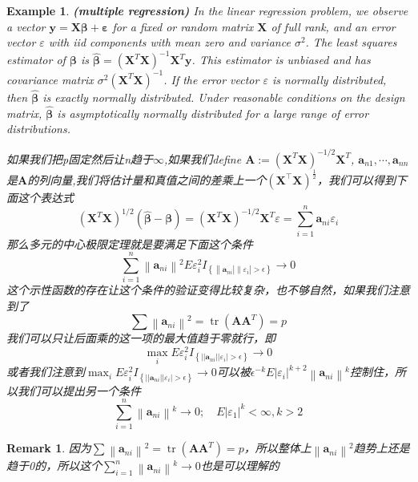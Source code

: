 \documentclass{article}
\newtheorem{example}{Example}[section]
\newtheorem{remark}{Remark}[theorem]
\begin{document}
\begin{example}
	\textbf{(multiple regression)} In the linear regression problem, we observe a vector $\mathbf{y}=\mathbf{X} \boldsymbol{\beta}+\boldsymbol{\varepsilon}$ for a fixed or random matrix $\mathbf{X}$ of full rank, and an error vector $\varepsilon$ with iid components with mean zero and variance $\sigma^2$. The least squares estimator of $\boldsymbol{\beta}$ is $\widehat{\boldsymbol{\beta}}=\left(\mathbf{X}^T \mathbf{X}\right)^{-1} \mathbf{X}^T \mathbf{y}$. This estimator is unbiased and has covariance matrix $\sigma^2\left(\mathbf{X}^T \mathbf{X}\right)^{-1}$. If the error vector $\varepsilon$ is normally distributed, then $\widehat{\boldsymbol{\beta}}$ is exactly normally distributed. Under reasonable conditions on the design matrix, $\widehat{\boldsymbol{\beta}}$ is asymptotically normally distributed for a large range of error distributions.
	\par 如果我们把p固定然后让n趋于$\infty$,如果我们define $\mathbf{A}:=\left(\mathbf{X}^T \mathbf{X}\right)^{-1 / 2} \mathbf{X}^T$, $\mathbf{a}_{n1},\cdots,\mathbf{a}_{nn}$是$\mathbf{A}$的列向量,我们将估计量和真值之间的差乘上一个$\left(\bm{X}^{\top}\bm{X}\right)^{\frac{1}{2}}$，我们可以得到下面这个表达式
	$$
	\left(\mathbf{X}^T \mathbf{X}\right)^{1 / 2}(\widehat{\boldsymbol{\beta}}-\boldsymbol{\beta})=\left(\mathbf{X}^T \mathbf{X}\right)^{-1 / 2} \mathbf{X}^T \varepsilon=\sum_{i=1}^n \mathbf{a}_{n i} \varepsilon_i
	$$
	那么多元的中心极限定理就是要满足下面这个条件
	$$
	\sum_{i=1}^n\left\|\mathbf{a}_{n i}\right\|^2 E \varepsilon_i^2 I_{\left\{\left\|\mathbf{a}_{n i}\left|\| \varepsilon_i\right|>\epsilon\right\}\right.} \rightarrow 0
	$$
	这个示性函数的存在让这个条件的验证变得比较复杂，也不够自然，如果我们注意到了
	$$
	\sum\left\|\mathbf{a}_{n i}\right\|^2=\operatorname{tr}\left(\mathbf{A A}^T\right)=p
	$$
	我们可以只让后面乘的这一项的最大值趋于零就行，即
	$$
	\max _i E \varepsilon_i^2 I_{\left\{|| \mathbf{a}_{n i}|| \varepsilon_i \mid>\epsilon\right\}} \rightarrow 0
	$$
	或者我们注意到$\max _i E \varepsilon_i^2 I_{\left\{|| \mathbf{a}_{n i}|| \varepsilon_i \mid>\epsilon\right\}} \rightarrow 0$可以被$\epsilon^{-k} E\left|\varepsilon_i\right|^{k+2}\left\|\mathbf{a}_{n i}\right\|^k$控制住，所以我们可以提出另一个条件
	$$
	\sum_{i=1}^n\left\|\mathbf{a}_{n i}\right\|^k \rightarrow 0 ; \quad E\left|\varepsilon_1\right|^k<\infty, k>2
	$$
\end{example}
\begin{remark}
	因为$\sum\left\|\mathbf{a}_{n i}\right\|^2=\operatorname{tr}\left(\mathbf{A A}^T\right)=p$，所以整体上$\left\|\mathbf{a}_{ni}\right\|^2$趋势上还是趋于0的，所以这个$\sum_{i=1}^n\left\|\mathbf{a}_{n i}\right\|^k \rightarrow 0$也是可以理解的
\end{remark}
\end{document}
